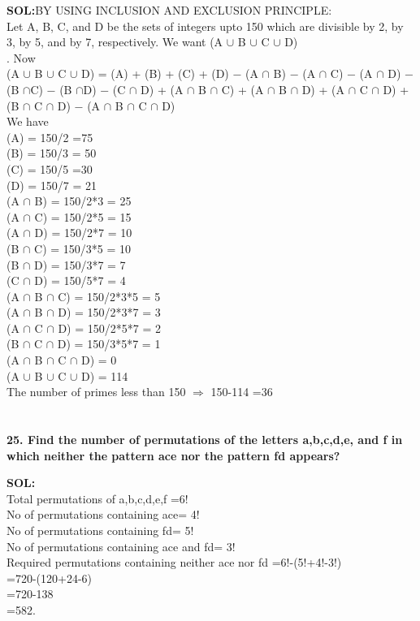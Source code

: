 \documentclass[8pt,a4paper]{article}
\begin{document}
\textbf{SOL:}BY USING INCLUSION AND EXCLUSION PRINCIPLE:\\Let A, B, C, and D be the sets of integers upto 150 which are divisible by 2, by 3, by 5, and by 7, respectively. We want (A $\cup$ B $\cup$ C $\cup$ D)\\
. Now\\
(A $\cup$ B $\cup$ C $\cup$ D) = (A) + (B) + (C) + (D) − (A $\cap$ B) − (A $\cap$ C) − (A $\cap$ D) − (B $\cap$C) − (B $\cap$D) − (C $\cap$ D) + (A $\cap$ B $\cap$ C) + (A $\cap$ B $\cap$ D) + (A $\cap$ C $\cap$ D) + (B $\cap$ C $\cap$ D) − (A $\cap$ B $\cap$ C $\cap$ D)\\
We have\\
(A) = 150/2 =75\\
(B) = 150/3 = 50\\
(C) = 150/5 =30\\
(D) = 150/7 = 21\\
(A $\cap$ B) = 150/2*3 = 25\\
(A $\cap$ C) = 150/2*5 = 15\\
(A $\cap$ D) = 150/2*7 = 10\\
(B $\cap$ C) = 150/3*5 = 10\\
(B $\cap$ D) = 150/3*7 = 7\\
(C $\cap$ D) = 150/5*7 = 4\\
(A $\cap$ B $\cap$ C) = 150/2*3*5 = 5\\
(A $\cap$ B $\cap$ D) = 150/2*3*7 = 3\\
(A $\cap$ C $\cap$ D) = 150/2*5*7 = 2\\
(B $\cap$ C $\cap$ D) = 150/3*5*7 = 1\\
(A $\cap$ B $\cap$ C $\cap$ D) = 0\\
(A $\cup$ B $\cup$ C $\cup$ D) = 114\\
The number of primes less than 150 $\Longrightarrow$ 150-114 =36\\



\section{}

\textbf{25. Find the number of permutations of the letters a,b,c,d,e, and f in which neither the
pattern ace nor the pattern fd appears?}

\textbf{SOL:}\\Total permutations of a,b,c,d,e,f =6!\\
No of permutations containing ace= 4!\\
No of permutations containing fd= 5!\\
No of permutations containing ace and fd= 3!\\
Required permutations containing neither ace nor fd =6!-(5!+4!-3!)\\
=720-(120+24-6)\\
=720-138\\
=582.\\
\end{document}
